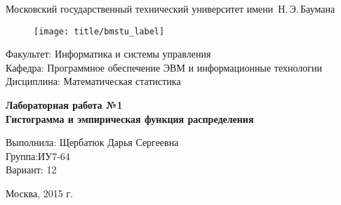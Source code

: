 
\thispagestyle{empty}

\begin{center}
    \Large
    Московский государственный технический университет имени~Н.\,Э.\,Баумана
\end{center}

\begin{figure}[h!]
    \begin{center}
        \texttt{[image: title/bmstu\_label]}
    \end{center}
\end{figure}

{\large
\noindent
Факультет: Информатика и системы управления\\[2mm]
\noindent
Кафедра: Программное обеспечение ЭВМ и информационные технологии\\[2mm]
\noindent
Дисциплина: Математическая статистика
\vspace{1.5cm}}

\begin{center}
    \Large
    \textbf{Лабораторная работа №1} \\
    \textbf{Гистограмма и эмпирическая функция распределения} \\
\end{center}
\vfill

\hfill\begin{minipage}{0.35\textwidth}
    Выполнила: Щербатюк Дарья Сергеевна\\
    Группа:ИУ7-64 \\
    Вариант: 12
\end{minipage}
\vfill

\begin{center}
    Москва, 2015 г.
\end{center}